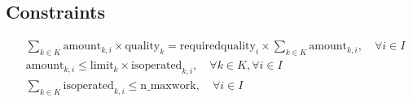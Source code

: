 \documentclass{article}
\begin{document}
\subsection*{Constraints}
\begin{align*}
    & \sum_{k \in K} \text{amount}_{k,i} \times \text{quality}_{k} = \text{requiredquality}_{i} \times \sum_{k \in K} \text{amount}_{k,i}, \quad \forall i \in I \\
    & \text{amount}_{k,i} \leq \text{limit}_{k} \times \text{isoperated}_{k,i}, \quad \forall k \in K, \forall i \in I \\
    & \sum_{k \in K} \text{isoperated}_{k,i} \leq \text{n\_maxwork}, \quad \forall i \in I
\end{align*}
\end{document}
